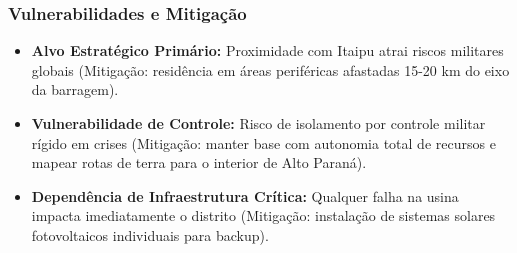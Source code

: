 \subsubsection{Vulnerabilidades e
Mitigação}

\begin{itemize}
\tightlist
\item
  \textbf{Alvo Estratégico Primário:} Proximidade com Itaipu atrai
  riscos militares globais (Mitigação: residência em áreas periféricas
  afastadas 15-20 km do eixo da barragem).
\item
  \textbf{Vulnerabilidade de Controle:} Risco de isolamento por controle
  militar rígido em crises (Mitigação: manter base com autonomia total
  de recursos e mapear rotas de terra para o interior de Alto Paraná).
\item
  \textbf{Dependência de Infraestrutura Crítica:} Qualquer falha na
  usina impacta imediatamente o distrito (Mitigação: instalação de
  sistemas solares fotovoltaicos individuais para backup).
\end{itemize}

